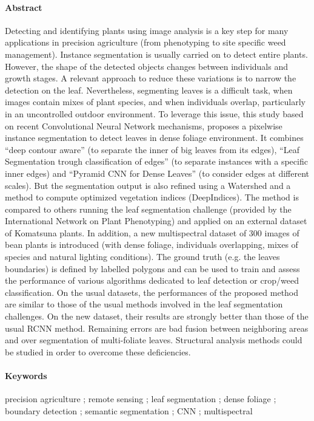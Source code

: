 \documentclass[../thesis.tex]{subfiles}
\begin{document}
	\paragraph{Abstract}
    Detecting and identifying plants using image analysis is a key step for many applications in precision agriculture (from phenotyping to site specific weed management). Instance segmentation is usually carried on to detect entire plants. However, the shape of the detected objects changes between individuals and growth stages. A relevant approach to reduce these variations is to narrow the detection on the leaf. Nevertheless, segmenting leaves is a difficult task, when images contain mixes of plant species, and when individuals overlap, particularly in an uncontrolled outdoor environment. To leverage this issue, this study based on recent Convolutional Neural Network mechanisms, proposes a pixelwise instance segmentation to detect leaves in dense foliage environment. It combines ``deep contour aware'' (to separate the inner of big leaves from its edges), ``Leaf Segmentation trough classification of edges'' (to separate instances with a specific inner edges) and ``Pyramid CNN for Dense Leaves'' (to consider edges at different scales). But the segmentation output is also refined using a Watershed and a method to compute optimized vegetation indices (DeepIndices). The method is compared to others running the leaf segmentation challenge (provided by the International Network on Plant Phenotyping) and applied on an external dataset of Komatsuna plants.  In addition, a new multispectral dataset of 300 images of bean plants is introduced (with dense foliage, individuals overlapping, mixes of species and natural lighting conditions). The ground truth (e.g. the leaves boundaries) is defined by labelled polygons and can be used to train and assess the performance of various algorithms dedicated to leaf detection or crop/weed classification. On the usual datasets, the performances of the proposed method are similar to those of the usual methods involved in the leaf segmentation challenges. On the new dataset, their results are strongly better than those of the usual RCNN method. Remaining errors are bad fusion between neighboring areas and over segmentation of multi-foliate leaves. Structural analysis methods could be studied in order to overcome these deficiencies.
    
    \paragraph{Keywords} precision agriculture ; remote sensing ; leaf segmentation ; dense foliage ; boundary detection ; semantic segmentation ; CNN ; multispectral
    \vfill
	
\end{document}
